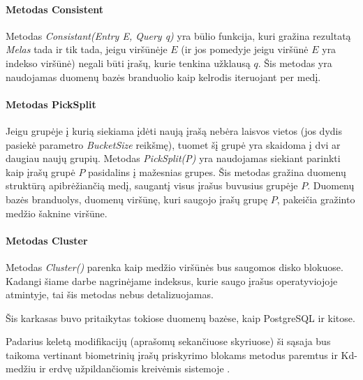 \paragraph{Metodas Consistent}
Metodas {\it Consistant(Entry E, Query q)} yra būlio funkcija, kuri gražina rezultatą {\it Melas} tada ir tik tada, jeigu viršūnėje $E$ (ir jos pomedyje jeigu viršūnė $E$ yra indekso viršūnė) negali būti įrašų, kurie tenkina užklausą $q$.
Šis metodas yra naudojamas duomenų bazės branduolio kaip kelrodis iteruojant per medį.

\paragraph{Metodas PickSplit}
Jeigu grupėje į kurią siekiama įdėti naują įrašą nebėra laisvos vietos (jos dydis pasiekė parametro {\it BucketSize} reikšmę), tuomet šį grupė yra skaidoma į dvi ar daugiau naujų grupių.
Metodas {\it PickSplit(P)} yra naudojamas siekiant parinkti kaip įrašų grupė $P$ pasidalins į mažesnias grupes.
Šis metodas gražina duomenų struktūrą apibrėžiančią medį, saugantį visus įrašus buvusius grupėje $P$.
Duomenų bazės branduolys, duomenų viršūnę, kuri saugojo įrašų grupę $P$, pakeičia gražinto medžio šaknine viršūne.

\paragraph{Metodas Cluster}
Metodas {\it Cluster()} parenka kaip medžio viršūnės bus saugomos disko blokuose.
Kadangi šiame darbe nagrinėjame indeksus, kurie saugo įrašus operatyviojoje atmintyje, tai šis metodas nebus detalizuojamas.


Šis karkasas buvo pritaikytas tokiose duomenų bazėse, kaip PostgreSQL \cite{eltabakh2006space} ir kitose.

Padarius keletą modifikacijų (aprašomų sekančiuose skyriuose) ši sąsaja bus taikoma vertinant biometrinių įrašų priskyrimo blokams metodus paremtus ir Kd-medžiu ir erdvę užpildančiomis kreivėmis sistemoje \cite{NeurotechnologyMegamatcherAccelerator}.







